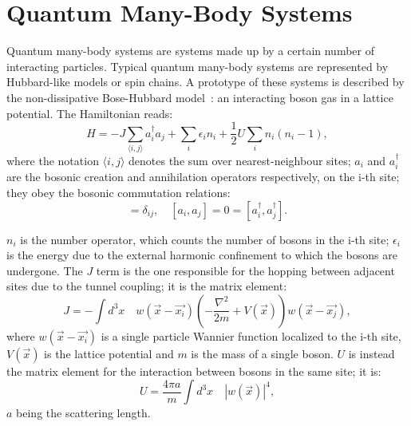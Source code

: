 
\section{Quantum Many-Body Systems}
\label{hubb_model}
Quantum many-body systems are systems made up by a certain number of interacting particles. Typical quantum many-body systems are represented by Hubbard-like models or spin chains. 
A prototype of these systems is described by the non-dissipative Bose-Hubbard model~\cite{Greiner_bose_hubbard}: an interacting boson gas in a lattice potential. The Hamiltonian reads:
\begin{equation}
    H = -J\sum_{\langle i,j \rangle} a^{\dagger}_i a_j + \sum_i \epsilon_i n_i+ \frac{1}{2} U \sum_i n_i(n_i -1 ),
\end{equation}
where the notation $\langle i, j \rangle$ denotes the sum over nearest-neighbour sites; $a_i$ and $a^{\dagger}_i$ are the bosonic creation and annihilation operators respectively, on the i-th site; they obey the bosonic commutation relations:
\begin{equation}
    [a_i, a_j^\dagger] = \delta_{ij}, \quad [a_i, a_j] = 0 = [a_i^\dagger, a_j^\dagger].
\end{equation}

$n_i$ is the number operator, which counts the number of bosons in the i-th site; $\epsilon_i$ is the energy due to the external harmonic confinement to which the bosons are undergone. The $J$ term is the one responsible for the hopping between adjacent sites due to the tunnel coupling; it is the matrix element:
\begin{equation}
    J = -\int d^3x \quad w(\Vec{x}-\Vec{x_i})(-\frac{\nabla^2}{2m}+V(\Vec{x}))w(\Vec{x}-\Vec{x_j}),
\end{equation}
where $w(\Vec{x}-\Vec{x_i})$ is a single particle Wannier function localized to the i-th site, $V(\Vec{x})$ is the lattice potential and $m$ is the mass of a single boson.
$U$ is instead the matrix element for the interaction between bosons in the same site; it is:
\begin{equation}
    U = \frac{4\pi a}{m} \int d^3x \quad |w(\Vec{x})|^4, 
\end{equation}
$a$ being the scattering length. 

